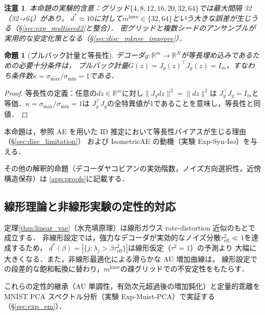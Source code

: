 \documentclass[11pt,a4paper]{jsarticle}
\newtheorem{proposition}{命題}
\newtheorem{remark}{注意}
\newcommand{\Jg}{J_g}
\newcommand{\R}{\mathbb{R}}
\newcommand{\kap}{\kappa}
\newcommand{\mknee}{m^{\mathrm{knee}}}
\begin{document}
\begin{remark}
本命題の実験的含意：グリッド$\{4,8,12,16,20,32,64\}$では最大間隔 32（32→64）があり，
$d^* \approx 10$に対して$\mknee \in \{32, 64\}$という大きな誤差が生じうる（§\ref{sec:exp_multiseed2}と整合）．
密グリッドと複数シードのアンサンブルが実用的な安定化策となる（§\ref{sec:disc_mknee_improve}）．
\end{remark}

\begin{proposition}[プルバック計量と等長性]\label{thm:pullback}
デコーダ$g: \R^m \to \R^N$が等長埋め込みであるための必要十分条件は，
プルバック計量$G(z) = \Jg(z)^\top \Jg(z) = I_m$，すなわち条件数$\kap = \sigma_{\max}/\sigma_{\min} = 1$である．
\end{proposition}

\begin{proof}
等長性の定義：任意の$dz \in \R^m$に対し$\|J_g dz\|^2 = \|dz\|^2$は
$J_g^\top J_g = I_m$と等価．$\kap = \sigma_{\max}/\sigma_{\min} = 1$は
$J_g^\top J_g$の全特異値が1であることを意味し，等長性と同値．
\end{proof}

本命題は，参照 AE を用いた ID 推定において等長性バイアスが生じる理由（§\ref{sec:disc_limitation}）
および IsometricAE の動機（実験 Exp-Syn-Iso）を与える．

その他の解釈的命題（デコーダヤコビアンの実効階数，ノイズ方向選択性，近傍構造保存）は
\ref{app:proofs}に記載する．

\subsection{線形理論と非線形実験の定性的対応}\label{sec:theory_bridge}

定理\ref{thm:linear_vae}（水充填原理）は線形ガウス rate-distortion 近似のもとで成立する．
非線形設定では，強力なデコーダが実効的なノイズ分散$\tau^2_\mathrm{eff} \ll 1$を達成するため，
$d^*(\beta) = |\{j : \lambda_j > \beta\tau^2_\mathrm{eff}\}|$は線形仮定（$\tau^2=1$）の予測より
大幅に大きくなる．また，非線形最適化による滑らかな AU 増加曲線は，
線形設定での段差的な飽和転換に替わり，$\mknee$の疎グリッドでの不安定性をもたらす．

これらの定性的継承（AU 単調性，有効次元超過後の増加鈍化）と定量的乖離を
MNIST PCA スペクトル分析（実験 Exp-Mnist-PCA）で実証する（§\ref{sec:exp_em}）．
\end{document}
